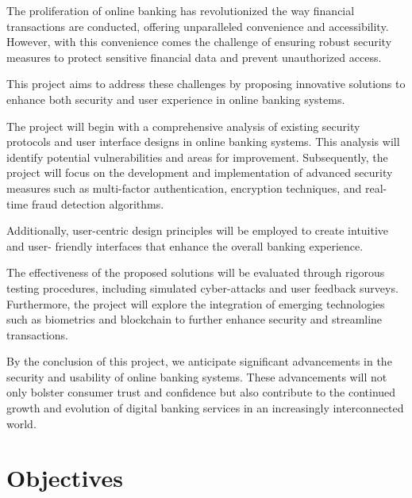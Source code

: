 \documentclass[12pt,a4paper]{report}
\begin{document}
The proliferation of online banking has revolutionized the way financial transactions are
conducted, offering unparalleled convenience and accessibility. However, with this
convenience comes the challenge of ensuring robust security measures to protect sensitive
financial data and prevent unauthorized access.

This project aims to address these challenges by proposing innovative solutions to enhance
both security and user experience in online banking systems.

The project will begin with a comprehensive analysis of existing security protocols and user
interface designs in online banking systems. This analysis will identify potential
vulnerabilities and areas for improvement. Subsequently, the project will focus on the
development and implementation of advanced security measures such as multi-factor
authentication, encryption techniques, and real-time fraud detection algorithms.

Additionally, user-centric design principles will be employed to create intuitive and user-
friendly interfaces that enhance the overall banking experience.

The effectiveness of the proposed solutions will be evaluated through rigorous testing
procedures, including simulated cyber-attacks and user feedback surveys. Furthermore, the
project will explore the integration of emerging technologies such as biometrics and
blockchain to further enhance security and streamline transactions.

By the conclusion of this project, we anticipate significant advancements in the security and
usability of online banking systems. These advancements will not only bolster consumer
trust and confidence but also contribute to the continued growth and evolution of digital
banking services in an increasingly interconnected world.

\chapter{Objectives}
\end{document}
